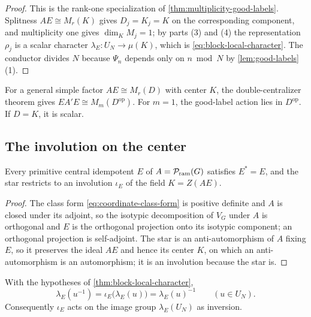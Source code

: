 \begin{proof}
This is the rank-one specialization of
\cref{thm:multiplicity-good-labels}.  Splitness \(AE\cong M_r(K)\) gives
\(D_j=K_j=K\) on the corresponding component, and multiplicity one gives
\(\dim_{K}M_j=1\); by parts (3) and (4) the representation \(\rho_j\) is a
scalar character \(\lambda_E:U_N\to\mu(K)\), which is
\eqref{eq:block-local-character}.  The conductor divides \(N\) because
\(\Psi_n\) depends only on \(n\bmod N\) by \cref{lem:good-labels}(1).
\end{proof}

For a general simple factor \(AE\cong M_r(D)\) with center \(K\), the
double-centralizer theorem gives \(EA'E\cong M_m(D^{\mathrm{op}})\).
For \(m=1\), the good-label action lies in \(D^{\mathrm{op}}\).  If
\(D=K\), it is scalar.

\subsection{The involution on the center}

\begin{lemma}
\label{lem:star-fixes-idempotents}
Every primitive central idempotent \(E\) of \(A=\mathcal P_{\mathrm{ram}}(G)\) satisfies
\(E^*=E\), and the star restricts to an involution
\(\iota_E\) of the field \(K=Z(AE)\).
\end{lemma}

\begin{proof}
The class form \eqref{eq:coordinate-class-form} is positive definite and
\(A\) is closed under its adjoint, so the isotypic decomposition of \(V_G\)
under \(A\) is orthogonal and \(E\) is the orthogonal projection onto its
isotypic component; an orthogonal projection is self-adjoint.  The star is an
anti-automorphism of \(A\) fixing \(E\), so it preserves the ideal \(AE\) and
hence its center \(K\), on which an anti-automorphism is an automorphism;
it is an involution because the star is.
\end{proof}

\begin{proposition}
\label{prop:star-inverts}
With the hypotheses of \cref{thm:block-local-character},
\begin{equation}
 \lambda_E(u^{-1})=\iota_E\bigl(\lambda_E(u)\bigr)
 =\lambda_E(u)^{-1}
 \qquad(u\in U_N).
 \label{eq:star-inverts}
\end{equation}
Consequently \(\iota_E\) acts on the image group \(\lambda_E(U_N)\) as
inversion.
\end{proposition}


